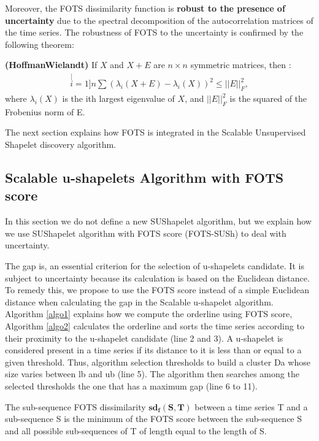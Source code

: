   Moreover, the FOTS dissimilarity function is \textbf{robust to the presence of
  uncertainty} due to the spectral decomposition of the autocorrelation matrices of the time series. The robustness of FOTS to the uncertainty is confirmed by the following theorem:   

\begin{theorem}
\textbf{(Hoffman\-Wielandt)} \cite{Bhatia1993} If $X$ and $X + E$ are $n \times
n$ symmetric matrices, then : 
\begin{eqnarray}
\stackrel[i=1]{n}{\sum}(\lambda_{i}(X+E)-\lambda_{i}(X))^{2}\leq||E||_{F}^{2},
\end{eqnarray}
where $\lambda_i(X)$ is the ith largest eigenvalue of $X$, and $||E||_{F}^{2}$
is the squared of the Frobenius norm of E.
\end{theorem}

The next section explains how FOTS is integrated in the Scalable Unsupervised Shapelet discovery algorithm.


\subsection{Scalable u-shapelets Algorithm with FOTS score}
In this section we do not define a new SUShapelet algorithm, but we explain how we use SUShapelet algorithm with FOTS score (FOTS-SUSh) to deal with uncertainty.



The gap is, an essential criterion for the selection of u-shapelets candidate. It is subject to uncertainty because its calculation is based on the
Euclidean distance. To remedy this, we propose to use the FOTS score instead of
a simple Euclidean distance when calculating the gap in the Scalable u-shapelet algorithm. Algorithm  \ref{algo1} explains how we compute the orderline using FOTS score, Algorithm \ref{algo2} calculates the orderline and sorts the time series according to their proximity to the u-shapelet candidate (line 2 and 3). A u-shapelet is considered present in a time series if its distance to it is less than or equal to a given threshold. Thus, algorithm selection thresholds to build a cluster Da whose size varies between lb and ub (line 5).  The algorithm then searches among the selected thresholds the one that has a maximum gap (line 6 to 11).
  

 \begin{definition}
The sub-sequence FOTS dissimilarity $\boldsymbol{sd_f(S, T)}$ between
a time series T and a sub-sequence S is the minimum of the FOTS
score between the sub-sequence S and all possible
sub-sequences of T of length equal to the length of S.
\end{definition}


